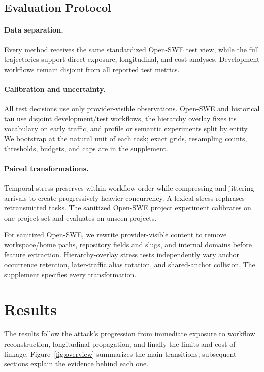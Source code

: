 \documentclass[letterpaper]{article} %
\begin{document}
\subsection{Evaluation Protocol}

\paragraph{Data separation.}
Every method receives the same standardized Open-SWE test view, while the full trajectories support
direct-exposure, longitudinal, and cost analyses. Development workflows remain disjoint from all
reported test metrics.

\paragraph{Calibration and uncertainty.}
All test decisions use only provider-visible observations. Open-SWE and historical tau use disjoint
development/test workflows, the hierarchy overlay fixes its vocabulary on early traffic, and profile or semantic
experiments split by entity. We bootstrap at the natural unit of each task; exact grids, resampling
counts, thresholds, budgets, and caps are in the supplement.

\paragraph{Paired transformations.}
Temporal stress preserves within-workflow order while compressing and jittering arrivals to create
progressively heavier concurrency. A lexical stress rephrases retransmitted tasks. The sanitized
Open-SWE project experiment calibrates on one project set and evaluates on unseen projects.

For sanitized Open-SWE, we rewrite provider-visible content to remove workspace/home paths,
repository fields and slugs, and internal domains before feature extraction. Hierarchy-overlay stress tests
independently vary anchor occurrence retention, later-traffic alias rotation, and shared-anchor
collision. The supplement specifies every transformation.

\section{Results}

The results follow the attack's progression from immediate exposure to workflow reconstruction,
longitudinal propagation, and finally the limits and cost of linkage. Figure~\ref{fig:overview}
summarizes the main transitions; subsequent sections explain the evidence behind each one.
\end{document}
